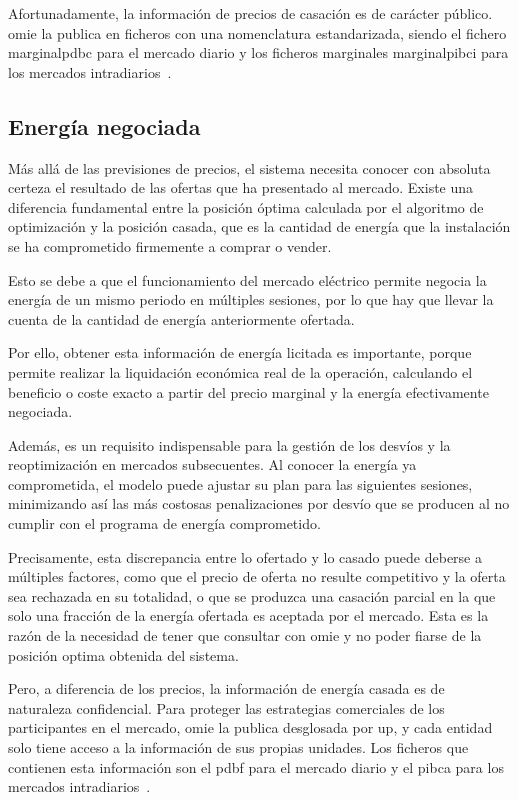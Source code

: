 Afortunadamente, la información de precios de casación es de carácter público. \Gls{omie} la publica en ficheros con una nomenclatura estandarizada, siendo el fichero \gls{marginalpdbc} para el mercado diario y los ficheros marginales \gls{marginalpibci} para los mercados intradiarios~\cite{cnmc2025resolucion}.

\subsection{Energía negociada}
\label{makereference4.1.2}

Más allá de las previsiones de precios, el sistema necesita conocer con absoluta certeza el resultado de las ofertas que ha presentado al mercado. Existe una diferencia fundamental entre la posición óptima calculada por el algoritmo de optimización y la posición casada, que es la cantidad de energía que la instalación se ha comprometido firmemente a comprar o vender.

Esto se debe a que el funcionamiento del mercado eléctrico permite negocia la energía de un mismo periodo en múltiples sesiones, por lo que hay que llevar la cuenta de la cantidad de energía anteriormente ofertada.

Por ello, obtener esta información de energía licitada es importante, porque permite realizar la liquidación económica real de la operación, calculando el beneficio o coste exacto a partir del precio marginal y la energía efectivamente negociada.

Además, es un requisito indispensable para la gestión de los desvíos y la reoptimización en mercados subsecuentes. Al conocer la energía ya comprometida, el modelo puede ajustar su plan para las siguientes sesiones, minimizando así las más costosas penalizaciones por desvío que se producen al no cumplir con el programa de energía comprometido.

Precisamente, esta discrepancia entre lo ofertado y lo casado puede deberse a múltiples factores, como que el precio de oferta no resulte competitivo y la oferta sea rechazada en su totalidad, o que se produzca una casación parcial en la que solo una fracción de la energía ofertada es aceptada por el mercado. Esta es la razón de la necesidad de tener que consultar con \gls{omie} y no poder fiarse de la posición optima obtenida del sistema.

Pero, a diferencia de los precios, la información de energía casada es de naturaleza confidencial. Para proteger las estrategias comerciales de los participantes en el mercado, \gls{omie} la publica desglosada por \gls{up}, y cada entidad solo tiene acceso a la información de sus propias unidades. Los ficheros que contienen esta información son el \gls{pdbf} para el mercado diario y el \gls{pibca} para los mercados intradiarios~\cite{cnmc2025resolucion}.

